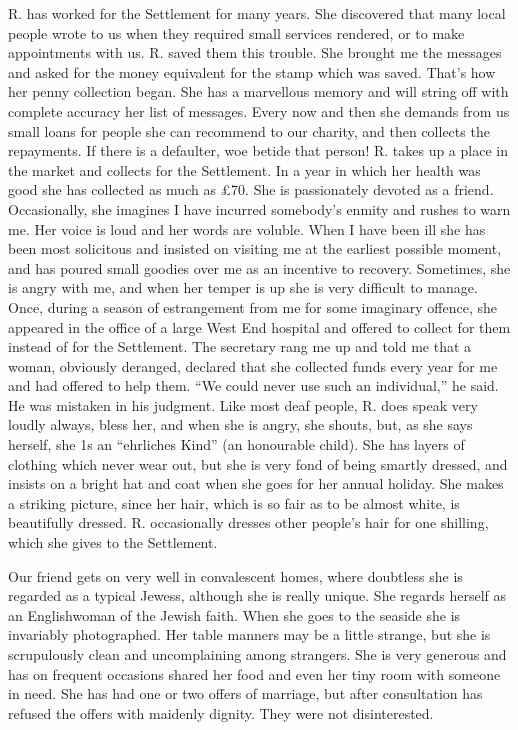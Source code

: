 R. has worked for the Settlement for many years. She
discovered that many local people wrote to us when they
required small services rendered, or to make appointments
with us. R. saved them this trouble. She brought
me the messages and asked for the money equivalent for
the stamp which was saved. That’s how her penny collection
began. She has a marvellous memory and will string
off with complete accuracy her list of messages. Every
now and then she demands from us small loans for people
she can recommend to our charity, and then collects the
repayments. If there is a defaulter, woe betide that person!
R. takes up a place in the market and collects for
the Settlement. In a year in which her health was good
she has collected as much as £70. She is passionately
devoted as a friend. Occasionally, she imagines I have incurred
somebody’s enmity and rushes to warn me. Her
voice is loud and her words are voluble. When I have
been ill she has been most solicitous and insisted on visiting
me at the earliest possible moment, and has poured
small goodies over me as an incentive to recovery. Sometimes,
she is angry with me, and when her temper is up
she is very difficult to manage. Once, during a season
of estrangement from me for some imaginary offence, she
appeared in the office of a large West End hospital and
offered to collect for them instead of for the Settlement.
The secretary rang me up and told me that a woman,
obviously deranged, declared that she collected funds
every year for me and had offered to help them. “We
could never use such an individual,” he said. He was
mistaken in his judgment. Like most deaf people, R.
does speak very loudly always, bless her, and when she
is angry, she shouts, but, as she says herself, she 1s an
“ehrliches Kind” (an honourable child). She has layers
of clothing which never wear out, but she is very fond of
being smartly dressed, and insists on a bright hat and coat
when she goes for her annual holiday. She makes a
striking picture, since her hair, which is so fair as to be
almost white, is beautifully dressed. R. occasionally
dresses other people’s hair for one shilling, which she gives
to the Settlement.

Our friend gets on very well in convalescent homes,
where doubtless she is regarded as a typical Jewess,
although she is really unique. She regards herself as an
Englishwoman of the Jewish faith. When she goes to the
seaside she is invariably photographed. Her table
manners may be a little strange, but she is scrupulously
clean and uncomplaining among strangers. She is very
generous and has on frequent occasions shared her food
and even her tiny room with someone in need. She has
had one or two offers of marriage, but after consultation
has refused the offers with maidenly dignity. They were
not disinterested.

